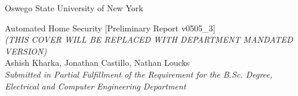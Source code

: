 \begin{center}
	\large
	Oswego State University of New York \\ 
	\vspace{2.5in}

	Automated Home Security [Preliminary Report v0505\_3] \\ 
	\tiny\textit{(THIS COVER WILL BE REPLACED WITH DEPARTMENT MANDATED VERSION)}\\
	\vspace{2in}
	\normalsize 
	Ashish Kharka, Jonathan Castillo, Nathan Loucks \\
	\vspace{0.5in}
	\small\textit{
		Submitted in Partial Fulfillment of the Requirement for the B.Sc. Degree, 	\\Electrical and Computer Engineering Department
		}
\end{center}